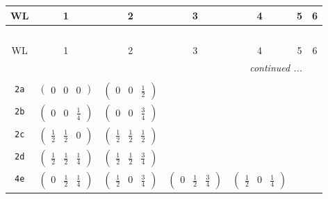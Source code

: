 \documentclass[fleqn,9pt,landscape]{jsarticle}
\begin{document}
\begin{center}
\renewcommand{\arraystretch}{1.2}
\begin{longtable}{ccccccc}
 \hline \hline
WL & 1 & 2 & 3 & 4 & 5 & 6 \\ \hline \endfirsthead

\multicolumn{6}{l}{\tablename\ \thetable{}} \\
 \hline \hline
WL & 1 & 2 & 3 & 4 & 5 & 6 \\ \hline \endhead

 \hline \hline
\multicolumn{6}{r}{\footnotesize\it continued ...} \\ \endfoot

 \hline \hline
\multicolumn{6}{r}{} \\ \endlastfoot

{\tt 2a} & $ \begin{pmatrix} 0 & 0 & 0 \end{pmatrix} $ & $ \begin{pmatrix} 0 & 0 & \frac{1}{2} \end{pmatrix} $ & $  $ & $  $ & $  $ & $  $ \\ \hline
{\tt 2b} & $ \begin{pmatrix} 0 & 0 & \frac{1}{4} \end{pmatrix} $ & $ \begin{pmatrix} 0 & 0 & \frac{3}{4} \end{pmatrix} $ & $  $ & $  $ & $  $ & $  $ \\ \hline
{\tt 2c} & $ \begin{pmatrix} \frac{1}{2} & \frac{1}{2} & 0 \end{pmatrix} $ & $ \begin{pmatrix} \frac{1}{2} & \frac{1}{2} & \frac{1}{2} \end{pmatrix} $ & $  $ & $  $ & $  $ & $  $ \\ \hline
{\tt 2d} & $ \begin{pmatrix} \frac{1}{2} & \frac{1}{2} & \frac{1}{4} \end{pmatrix} $ & $ \begin{pmatrix} \frac{1}{2} & \frac{1}{2} & \frac{3}{4} \end{pmatrix} $ & $  $ & $  $ & $  $ & $  $ \\ \hline
{\tt 4e} & $ \begin{pmatrix} 0 & \frac{1}{2} & \frac{1}{4} \end{pmatrix} $ & $ \begin{pmatrix} \frac{1}{2} & 0 & \frac{3}{4} \end{pmatrix} $ & $ \begin{pmatrix} 0 & \frac{1}{2} & \frac{3}{4} \end{pmatrix} $ & $ \begin{pmatrix} \frac{1}{2} & 0 & \frac{1}{4} \end{pmatrix} $ & $  $ & $  $ \\ \hline

\end{longtable}
\end{center}
\end{document}
